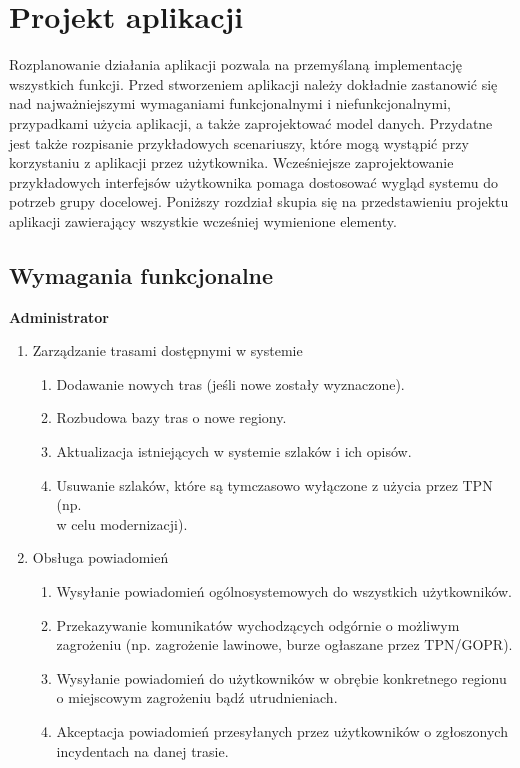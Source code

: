 \section{Projekt aplikacji} 
Rozplanowanie działania aplikacji pozwala na przemyślaną implementację wszystkich funkcji. Przed stworzeniem aplikacji należy dokładnie zastanowić się nad najważniejszymi wymaganiami funkcjonalnymi i niefunkcjonalnymi, przypadkami użycia aplikacji, a także zaprojektować model danych. Przydatne jest także rozpisanie przykładowych scenariuszy, które mogą wystąpić przy korzystaniu z aplikacji przez użytkownika. Wcześniejsze zaprojektowanie przykładowych interfejsów użytkownika pomaga dostosować wygląd systemu do potrzeb grupy docelowej. Poniższy rozdział skupia się na przedstawieniu projektu aplikacji zawierający wszystkie wcześniej wymienione elementy.
    \subsection{Wymagania funkcjonalne}
    \noindent
    \textbf{Administrator}
    \begin{enumerate}
        \item Zarządzanie trasami dostępnymi w systemie
        \begin{enumerate}
            \item Dodawanie nowych tras (jeśli nowe zostały wyznaczone).
            \item Rozbudowa bazy tras o nowe regiony.
            \item Aktualizacja istniejących w systemie szlaków i ich opisów.
            \item Usuwanie szlaków, które są tymczasowo wyłączone z użycia przez TPN (np. \\w celu modernizacji).
        \end{enumerate}
        \item Obsługa powiadomień
        \begin{enumerate}
            \item Wysyłanie powiadomień ogólnosystemowych do wszystkich użytkowników.
            \item Przekazywanie komunikatów wychodzących odgórnie o możliwym zagrożeniu (np. zagrożenie lawinowe, burze ogłaszane przez TPN/GOPR).
            \item Wysyłanie powiadomień do użytkowników w obrębie konkretnego regionu o miejscowym zagrożeniu bądź utrudnieniach.
            \item Akceptacja powiadomień przesyłanych przez użytkowników o zgłoszonych incydentach na danej trasie.
        \end{enumerate}
    \end{enumerate}
